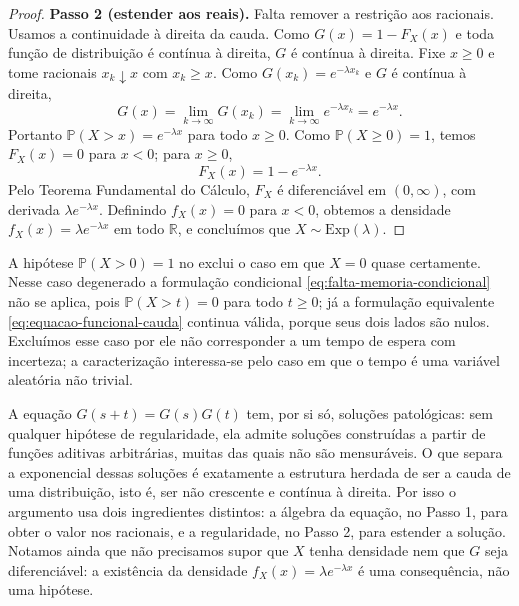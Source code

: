 \begin{proof}
\smallskip
\noindent\textbf{Passo 2 (estender aos reais).}
Falta remover a restrição aos racionais. Usamos a continuidade à direita da
cauda. Como $G(x)=1-F_X(x)$ e toda função de distribuição é contínua à
direita, $G$ é contínua à direita. Fixe $x\geqslant 0$ e tome racionais
$x_k\downarrow x$ com $x_k\geqslant x$. Como $G(x_k)=e^{-\lambda x_k}$ e
$G$ é contínua à direita,
\[
  G(x)=\lim_{k\to\infty}G(x_k)
  =\lim_{k\to\infty}e^{-\lambda x_k}
  =e^{-\lambda x}.
\]
Portanto $\mathbb{P}(X>x)=e^{-\lambda x}$ para todo $x\geqslant 0$. Como
$\mathbb{P}(X\geqslant 0)=1$, temos $F_X(x)=0$ para $x<0$; para
$x\geqslant 0$,
\[
  F_X(x)=1-e^{-\lambda x}.
\]
Pelo Teorema Fundamental do Cálculo, $F_X$ é diferenciável em
$(0,\infty)$, com derivada $\lambda e^{-\lambda x}$. Definindo $f_X(x)=0$
para $x<0$, obtemos a densidade $f_X(x)=\lambda e^{-\lambda x}$ em todo
$\mathbb{R}$, e concluímos que $X\sim\mathrm{Exp}(\lambda)$.
\end{proof}

\begin{remark}\label{rem:caso-degenerado}
A hipótese $\mathbb{P}(X>0)=1$ no 
exclui o caso em que $X=0$ quase certamente. Nesse caso degenerado a
formulação condicional \eqref{eq:falta-memoria-condicional} não se aplica,
pois $\mathbb{P}(X>t)=0$ para todo $t\geqslant 0$; já a formulação
equivalente \eqref{eq:equacao-funcional-cauda} continua válida, porque seus
dois lados são nulos. Excluímos esse caso por ele não corresponder a um
tempo de espera com incerteza; a caracterização interessa-se pelo caso em
que o tempo é uma variável aleatória não trivial.
\end{remark}

\begin{remark}\label{rem:regularidade-equacao-funcional}
A equação $G(s+t)=G(s)G(t)$ tem, por si só, soluções patológicas: sem
qualquer hipótese de regularidade, ela admite soluções construídas a partir
de funções aditivas arbitrárias, muitas das quais não são mensuráveis. O que
separa a exponencial dessas soluções é exatamente a estrutura herdada de ser
a cauda de uma distribuição, isto é, ser não crescente e contínua à direita.
Por isso o argumento usa dois ingredientes distintos: a álgebra da equação,
no Passo 1, para obter o valor nos racionais, e a regularidade, no Passo 2,
para estender a solução. Notamos ainda que não precisamos supor que $X$ tenha
densidade nem que $G$ seja diferenciável: a existência da densidade
$f_X(x)=\lambda e^{-\lambda x}$ é uma consequência, não uma hipótese.
\end{remark}

